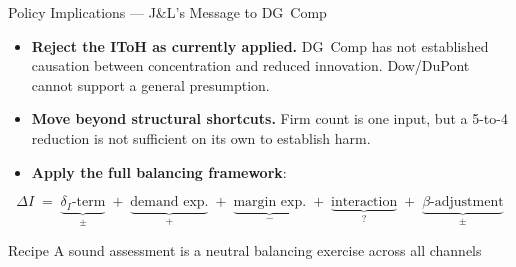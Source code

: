 \documentclass[10pt, aspectratio=169]{beamer}
\begin{document}
\begin{frame}{Policy Implications — J\&L's Message to DG~Comp}
  \begin{itemize}
    \item \textbf{Reject the IToH as currently applied.}
          DG~Comp has not established causation between
          concentration and reduced innovation. Dow/DuPont
          cannot support a general presumption.

    \item \textbf{Move beyond structural shortcuts.} Firm
          count is one input, but a 5-to-4 reduction is not
          sufficient on its own to establish harm.

    \item \textbf{Apply the full balancing framework}:

  \end{itemize}

  \[
    \Delta I \;=\;
    \underbrace{\delta_I\text{-term}}_{\pm}
    \;+\;
    \underbrace{\text{demand exp.}}_{+}
    \;+\;
    \underbrace{\text{margin exp.}}_{-}
    \;+\;
    \underbrace{\text{interaction}}_{?}
    \;+\;
    \underbrace{\beta\text{-adjustment}}_{\pm}
  \]

  \begin{block}{Recipe}
    A sound assessment is a neutral balancing exercise
    across all channels
  \end{block}
\end{frame}
\end{document}
